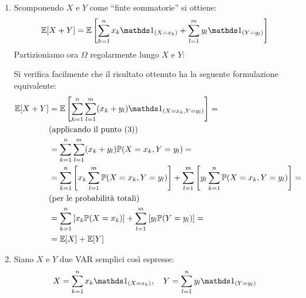 \begin{dimo}
\begin{enumerate}
    \item Scomponendo $X$ e $Y$ come ``finte sommatorie'' si ottiene:
      $$\EE[X+Y] = \EE \left[\sum\limits_{k=1}^n x_k \Ind_{(X = x_k)} + \sum\limits_{l=1}^m y_l \Ind_{(Y = y_l)} \right]$$
      Partizioniamo ora $\Omega$ regolarmente lungo $X$ e $Y$:
      \begin{figure}[H]
        \centering
        \label{Partizioni_XY}
      \end{figure}
      Si verifica facilmente che il risultato ottenuto ha la seguente formulazione equivalente:
      \begin{align*}
        \EE[X+Y] &= \EE\left[\sum\limits_{k=1}^n \sum\limits_{l=1}^m (x_k+y_l) \Ind_{(X = x_k, Y = y_l)}\right] =\\
        & \text{(applicando il punto (3))} \\
        &= \sum\limits_{k=1}^n \sum\limits_{l=1}^m (x_k+y_l) \PP(X = x_k, Y = y_l) = \\
        &= \sum\limits_{k=1}^n \left[ x_k \sum\limits_{l=1}^m \PP(X = x_k, Y = y_l) \right] + \sum\limits_{l=1}^m \left[ y_l \sum\limits_{k=1}^n \PP(X = x_k, Y = y_l) \right] =\\
        &\text{(per le probabilità totali)}\\
        &= \sum\limits_{k=1}^n \left[ x_k \PP(X = x_k) \right] + \sum\limits_{l=1}^m \left[ y_l \PP(Y = y_l) \right] = \\
        &= \EE[X] + \EE[Y]
      \end{align*}
    \item Siano $X$ e $Y$ due VAR semplici così espresse:
      $$X = \sum\limits_{k=1}^{n} x_k \Ind_{(X = x_k)}, \quad Y = \sum\limits_{l=1}^{n} y_l \Ind_{(Y = y_l)}$$

\end{enumerate}
\end{dimo}
